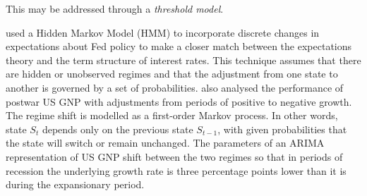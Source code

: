 \documentclass[12pt, a4paper, oneside]{article} %
\begin{document}
This may be addressed through a \emph{threshold model}. 

\citet{hamilton1988rational} used a Hidden Markov Model (HMM) to incorporate discrete changes in expectations about Fed policy to make a closer match between the expectations theory and the term structure of interest rates.  This technique assumes that there are hidden or unobserved regimes and that the adjustment from one state to another is governed by a set of probabilities.  \citet{Hamilton1989} also analysed the performance of postwar US GNP with adjustments from periods of positive to negative growth. The regime shift is modelled as a first-order Markov process.  In other words, state $S_t$ depends only on the previous state $S_{t-1}$, with given probabilities that the state will switch or remain unchanged.  The parameters of an ARIMA representation of US GNP shift between the two regimes so that in periods of recession the underlying growth rate is three percentage points lower than it is during the expansionary period.   




\end{document}
